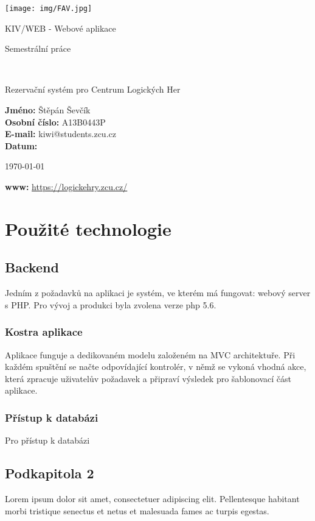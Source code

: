 \documentclass[12pt,a4paper]{article}
\author{Jan Šmejkal}
\let\oldsection\section
\renewcommand\section{\clearpage\oldsection}
\begin{document}
\begin{titlepage}

\texttt{[image: img/FAV.jpg]}
\\[160 pt]
\centerline{ \Huge \sc KIV/WEB - Webové aplikace}
\centerline{ \huge \sc Semestrální práce }
\\[12 pt]
{\large \sc
\centerline{Rezervační systém pro Centrum Logických Her}
}


{
\vfill 
\parindent=0cm
\textbf{Jméno:} Štěpán Ševčík\\
\textbf{Osobní číslo:} A13B0443P\\
\textbf{E-mail:} kiwi@students.zcu.cz\\
\textbf{Datum:} {\large \today\par} %
\textbf{www:} \url{https://logickehry.zcu.cz/}

}

\end{titlepage}


\newpage
\setcounter{page}{2}
\setcounter{tocdepth}{3}
\tableofcontents

{\section{Použité technologie}}
{\subsection{Backend}}
Jedním z požadavků na aplikaci je systém, ve kterém má fungovat: webový server s PHP. Pro vývoj a produkci byla zvolena verze php 5.6.
{\subsubsection{Kostra aplikace}}
Aplikace funguje a dedikovaném modelu založeném na MVC architektuře. Při každém spuštění se načte odpovídající kontrolér, v němž se vykoná vhodná akce, která zpracuje uživatelův požadavek a připraví výsledek pro šablonovací část aplikace.
{\subsubsection{Přístup k databázi}}
Pro přístup k databázi 
{\subsection{Podkapitola 2}}
Lorem ipsum dolor sit amet, consectetuer adipiscing elit. Pellentesque habitant morbi tristique senectus et netus et malesuada fames ac turpis egestas.
\end{document}
